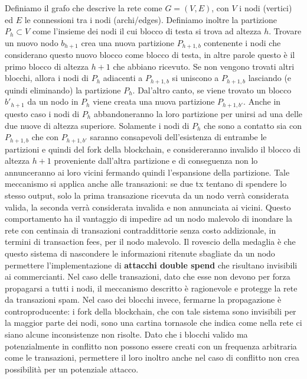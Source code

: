 Definiamo il grafo che descrive la rete come $G = (V,E)$, con $V$ i nodi (vertici) ed $E$ le connessioni tra i nodi (archi/edges). Definiamo inoltre la partizione $P_h \subset V$ come l'insieme dei nodi il cui blocco di testa si trova ad altezza $h$. Trovare un nuovo nodo $b_{h+1}$ crea una nuova partizione $P_{h+1,b}$ contenente i nodi che considerano questo nuovo blocco come blocco di testa, in altre parole questo è il primo blocco di altezza $h+1$ che abbiano ricevuto. Se non vengono trovati altri blocchi, allora i nodi di $P_h$ adiacenti a $P_{h+1,b}$ si uniscono a $P_{h+1,b}$ lasciando (e quindi eliminando) la partizione $P_h$. Dal'altro canto, se viene trovato un blocco $b'_{h+1}$ da un nodo in $P_h$ viene creata una nuova partizione $P_{h+1,b'}$. Anche in questo caso i nodi di $P_h$ abbandoneranno la loro partizione per unirsi ad una delle due nuove di altezza superiore. Solamente i nodi di $P_h$ che sono a contatto sia con $P_{h+1,b}$ che con $P_{h+1,b'}$ saranno consapevoli dell'esistenza di entrambe le partizioni e quindi del fork della blockchain, e considereranno invalido il blocco di altezza $h+1$ proveniente dall'altra partizione e di conseguenza non lo annunceranno ai loro vicini fermando quindi l'espansione della partizione. Tale meccanismo si applica anche alle transazioni: se due tx tentano di spendere lo stesso output, solo la prima transazione ricevuta da un nodo verrà considerata valida, la seconda verrà considerata invalida e non annunciata ai vicini. Questo comportamento ha il vantaggio di impedire ad un nodo malevolo di inondare la rete con centinaia di transazioni contraddittorie senza costo addizionale, in termini di transaction fees, per il nodo malevolo. Il rovescio della medaglia è che questo sistema di nascondere le informazioni ritenute sbagliate da un nodo permettere l'implementazione di \textbf{attacchi double spend} che risultano invisibili ai commercianti. Nel caso delle transazioni, dato che esse non devono per forza propagarsi a tutti i nodi, il meccanismo descritto è ragionevole e protegge la rete da transazioni spam. Nel caso dei blocchi invece, fermarne la propagazione è controproducente: i fork della blockchain, che con tale sistema sono invisibili per la maggior parte dei nodi, sono una cartina tornasole che indica come nella rete ci siano alcune inconsistenze non risolte. Dato che i blocchi valido ma potenzialmente in conflitto non possono essere creati con un frequenza arbitraria come le transazioni, permettere il loro inoltro anche nel caso di conflitto non crea possibilità per un potenziale attacco.

